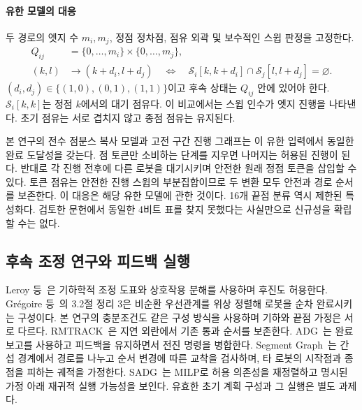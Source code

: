 \documentclass[11pt,a4paper]{article}
\theoremstyle{remark}
\newcommand{\Sw}{\mathcal S}
\begin{document}
\paragraph{유한 모델의 대응}
두 경로의 엣지 수 $m_i,m_j$, 정점 정차점, 점유 외곽 및 보수적인 스윕 판정을 고정한다.
\begin{equation}
\begin{split}
 Q_{ij}&=\{0,\ldots,m_i\}\times\{0,\ldots,m_j\},\\
 (k,l)&\longrightarrow(k+d_i,l+d_j)
 \quad\Longleftrightarrow\quad
 \Sw_i[k,k+d_i]\cap\Sw_j[l,l+d_j]=\varnothing.
\end{split}
\label{eq:prior-progress}
\end{equation}
$(d_i,d_j)\in\{(1,0),(0,1),(1,1)\}$이고 후속 상태는 $Q_{ij}$ 안에 있어야 한다. $\Sw_i[k,k]$는 정점 $k$에서의 대기 점유다. 이 비교에서는 스윕 인수가 엣지 진행을 나타낸다. 초기 점유는 서로 겹치지 않고 종점 점유는 유지된다.

본 연구의 전수 점분스 복사 모델과 고전 구간 진행 그래프는 이 유한 입력에서 동일한 완료 도달성을 갖는다. 점 토큰만 소비하는 단계를 지우면 나머지는 허용된 진행이 된다. 반대로 각 진행 전후에 다른 로봇을 대기시키며 안전한 원래 정점 토큰을 삽입할 수 있다. 토큰 점유는 안전한 진행 스윕의 부분집합이므로 두 변환 모두 안전과 경로 순서를 보존한다. 이 대응은 해당 유한 모델에 관한 것이다. 16개 끝점 분류 역시 제한된 특성화다. 검토한 문헌에서 동일한 4비트 표를 찾지 못했다는 사실만으로 신규성을 확립할 수는 없다.

\subsection{후속 조정 연구와 피드백 실행}
Leroy 등~\cite{leroy1999}은 기하학적 조정 도표와 상호작용 분해를 사용하며 후진도 허용한다. Gr\'egoire 등~\cite{gregoire2015}의 3.2절 정리 3은 비순환 우선관계를 위상 정렬해 로봇을 순차 완료시키는 구성이다. 본 연구의 충분조건도 같은 구성 방식을 사용하며 기하와 끝점 가정은 서로 다르다. RMTRACK~\cite{cap2016}은 지연 외란에서 기존 통과 순서를 보존한다. ADG~\cite{hoenig2019}는 완료 보고를 사용하고 피드백을 유지하면서 전진 명령을 병합한다. Segment Graph~\cite{coskun2021}는 간섭 경계에서 경로를 나누고 순서 변경에 따른 교착을 검사하며, 타 로봇의 시작점과 종점을 피하는 궤적을 가정한다. SADG~\cite{berndt2024}는 MILP로 허용 의존성을 재정렬하고 명시된 가정 아래 재귀적 실행 가능성을 보인다. 유효한 초기 계획 구성과 그 실행은 별도 과제다.
\end{document}
